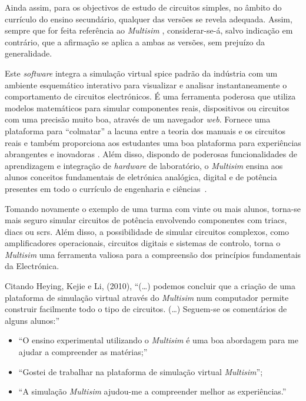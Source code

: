 Ainda assim, para os objectivos de estudo de circuitos simples, no âmbito do currículo do ensino secundário, qualquer das versões se revela adequada. Assim, sempre que for feita referência ao \textit{Multisim} \cite{multisim}, considerar-se-á, salvo indicação em contrário, que a afirmação se aplica a ambas as versões, sem prejuízo da generalidade.

Este \textit{software} integra a simulação virtual \acrfull{spice} padrão da indústria com um ambiente esquemático interativo para visualizar e analisar instantaneamente o comportamento de circuitos electrónicos. É uma ferramenta poderosa que utiliza modelos matemáticos para simular componentes reais, dispositivos ou circuitos com uma precisão muito boa, através de um navegador \textit{web}. Fornece uma plataforma para ``colmatar'' a lacuna entre a teoria dos manuais e os circuitos reais e também proporciona aos estudantes uma boa plataforma para experiências abrangentes e inovadoras \cite{multisim}. Além disso, dispondo de poderosas funcionalidades de aprendizagem e integração de \textit{hardware} de laboratório, o \textit{Multisim} ensina aos alunos conceitos fundamentais de eletrónica analógica, digital e de potência presentes em todo o currículo de engenharia e ciências~\cite{ImportantSimSoftware}.

Tomando novamente o exemplo de uma turma com vinte ou mais alunos, torna-se mais seguro simular circuitos de potência envolvendo componentes com \gls{triac}s, \gls{diac}s ou \gls{scr}s. Além disso, a possibilidade de simular circuitos complexos, como amplificadores operacionais, circuitos digitais e sistemas de controlo, torna o \textit{Multisim} uma ferramenta valiosa para a compreensão dos princípios fundamentais da Electrónica.

Citando Heying, Kejie e Li, (2010), ``(\ldots) podemos concluir que a criação de uma plataforma de simulação virtual através do \textit{Multisim} num computador permite construir facilmente todo o tipo de circuitos. (\ldots) Seguem-se os comentários de alguns alunos:''
\begin{itemize}
    \item ``O ensino experimental utilizando o \textit{Multisim} é uma boa abordagem para me ajudar a compreender as matérias;''
    \item ``Gostei de trabalhar na plataforma de simulação virtual \textit{Multisim}'';
    \item ``A simulação \textit{Multisim} ajudou-me a compreender melhor as experiências.''
\end{itemize}

